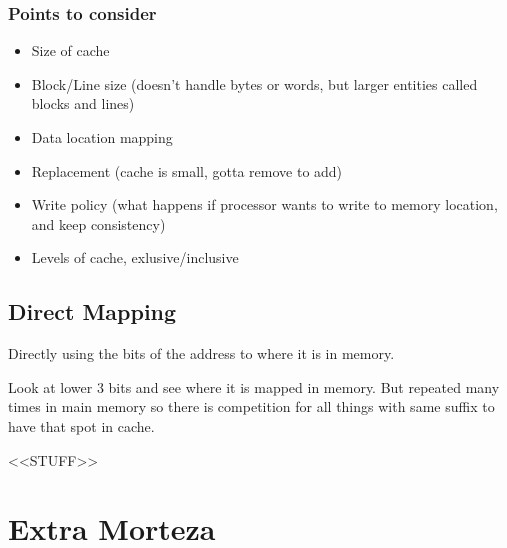 \documentclass{article}
\begin{document}
		\subsubsection*{Points to consider}
		\begin{itemize}
			\item Size of cache
			\item Block/Line size (doesn't handle bytes or words, but larger entities called blocks and lines)
			\item Data location mapping
			\item Replacement (cache is small, gotta remove to add)
			\item Write policy (what happens if processor wants to write to memory location, and keep consistency)
			\item Levels of cache, exlusive/inclusive
		\end{itemize}

	\subsection*{Direct Mapping}
		Directly using the bits of the address to where it is in memory.

		Look at lower 3 bits and see where it is mapped in memory. But repeated many times in main memory so there is competition for all things with same suffix to have that spot in cache.

	<<STUFF>>




\section{Extra Morteza}
\end{document}
